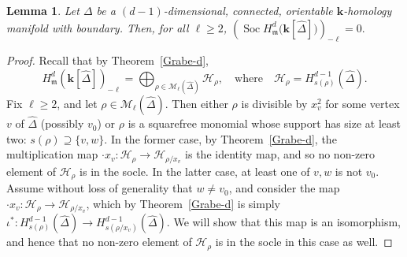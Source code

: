 \documentclass[10pt]{amsart}
\newtheorem{lemma}[theorem]{Lemma}
\theoremstyle{definition}
\DeclareMathOperator{\Soc}{Soc}
\newcommand{\complet}[1]{\hat{#1}}
\newcommand{\field}{\mathbf{k}}
\newcommand{\M}{{\mathcal M}}
\newcommand{\HH}{{\mathcal H}}
\newcommand{\mideal}{\ensuremath{\mathfrak{m}}}
\begin{document}
\begin{lemma} \label{vanishing-socle}
Let $\Delta$ be a $(d-1)$-dimensional, connected, orientable $\field$-homology manifold with boundary. Then, for all $\ell\geq 2$,
$\left(\Soc H^{d}_\mideal\big(\field[\complet{\Delta}]\big)\right)_{-\ell}=0.$
\end{lemma}
\begin{proof} Recall that by Theorem~\ref{Grabe-d},
\begin{equation} \label{eq:H_d}
H^d_{\mideal}(\field[\complet{\Delta}])_{-\ell}=\bigoplus_{\rho\in\M_\ell(\complet{\Delta})} \HH_{\rho}, \quad \mbox{where} \quad \HH_{\rho}=H^{d-1}_{s(\rho)}(\complet{\Delta}).
\end{equation}
Fix $\ell\geq 2$, and let $\rho\in\M_\ell(\complet{\Delta})$. Then either $\rho$ is divisible by $x_v^2$ for some vertex $v$ of $\complet{\Delta}$ (possibly $v_0$) or $\rho$ is a squarefree monomial whose support has size at least two: $s(\rho)\supseteq\{v, w\}$. In the former case, by Theorem~\ref{Grabe-d}, the multiplication map $\cdot x_v: \HH_{\rho} \to \HH_{\rho/x_v}$ is the identity map, and so no non-zero element of $\HH_{\rho}$ is in the socle. In the latter case, at least one of $v,w$ is not $v_0$. Assume without loss of generality that $w\neq v_0$, and consider the map $\cdot x_v: \HH_{\rho} \to \HH_{\rho/x_v}$, which by Theorem~\ref{Grabe-d} is simply $\iota^\ast: H^{d-1}_{s(\rho)}(\complet{\Delta}) \to H^{d-1}_{s(\rho/x_v)}(\complet{\Delta})$. We will show that this map is an isomorphism, and hence that no non-zero element of $\HH_{\rho}$ is in the socle in this case as well.


\end{proof}
\end{document}
